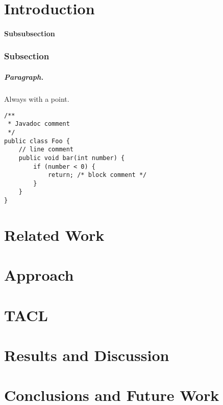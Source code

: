 \documentclass{seal_thesis}
\newcommand{\toolname}{\textsc{TACL}}
\begin{document}
\begin{abstract}
\end{abstract}

\begin{zusammenfassung}
\end{zusammenfassung}

\tableofcontents
\listoffigures
\listoftables
\lstlistoflistings

\mainmatter
\chapter{Introduction}
\label{sec:intro}


%
\newpage
\subsubsection{Subsubsection}

\subsection{Subsection}
%
\paragraph{Paragraph.} Always with a point.

\begin{lstlisting}[caption=An example code snippet]
/**
 * Javadoc comment
 */
public class Foo {
	// line comment
	public void bar(int number) {
		if (number < 0) {
			return; /* block comment */
		}
	}
}
\end{lstlisting}



\chapter{Related Work}
\label{sec:related}


\chapter{Approach}

\chapter{\toolname}


\chapter{Results and Discussion}

\chapter{Conclusions and Future Work}




\backmatter


\end{document}
